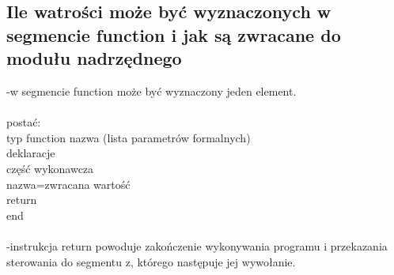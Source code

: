 \subsection{Ile watrości może być wyznaczonych w segmencie function i jak są zwracane do modułu nadrzędnego}
-w segmencie function może być wyznaczony jeden element.
\\
\\
postać:
\\
typ function nazwa (lista parametrów formalnych)
\\
deklaracje
\\
część wykonawcza
\\
nazwa=zwracana wartość
\\
return
\\
end
\\
\\
-instrukcja return powoduje zakończenie wykonywania programu i przekazania sterowania do segmentu z, którego następuje jej wywołanie.
